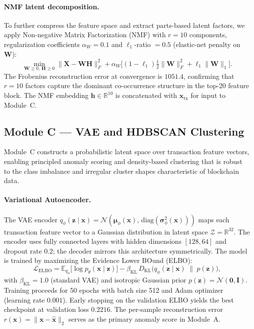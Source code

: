 \documentclass[journal]{IEEEtran}
\begin{document}
\paragraph{NMF latent decomposition.}
To further compress the feature space and extract parts-based latent factors,
we apply Non-negative Matrix Factorization (NMF) with
$r = 10$ components, regularization coefficients
$\alpha_W = 0.1$ and $\ell_1$-ratio $= 0.5$
(elastic-net penalty on $\mathbf{W}$):
\begin{equation}
  \min_{\mathbf{W} \geq 0,\, \mathbf{H} \geq 0}
    \bigl\|\mathbf{X} - \mathbf{W}\mathbf{H}\bigr\|_F^2
    + \alpha_W \bigl[(1 - \ell_1)\tfrac{1}{2}\|\mathbf{W}\|_F^2
                    + \ell_1 \|\mathbf{W}\|_1\bigr].
  \label{eq:nmf}
\end{equation}
The Frobenius reconstruction error at convergence is $\num{1051.4}$,
confirming that $r = 10$ factors capture the dominant co-occurrence structure
in the top-20 feature block.
The NMF embedding $\mathbf{h} \in \mathbb{R}^{10}$ is concatenated with
$\mathbf{x}_{\mathrm{tx}}$ for input to Module~C.

\subsection{Module C — VAE and HDBSCAN Clustering}
\label{sec:module_c}

Module~C constructs a probabilistic latent space over transaction feature
vectors, enabling principled anomaly scoring and density-based clustering
that is robust to the class imbalance and irregular cluster shapes
characteristic of blockchain data.

\paragraph{Variational Autoencoder.}
The VAE encoder
$q_\phi(\mathbf{z} \mid \mathbf{x}) = \mathcal{N}(\boldsymbol{\mu}_\phi(\mathbf{x}),\,
\mathrm{diag}(\boldsymbol{\sigma}^2_\phi(\mathbf{x})))$
maps each transaction feature vector to a Gaussian distribution in latent
space $\mathcal{Z} = \mathbb{R}^{32}$.
The encoder uses fully connected layers with hidden dimensions $[128, 64]$
and dropout rate $0.2$; the decoder mirrors this architecture symmetrically.
The model is trained by maximizing the Evidence Lower BOund (ELBO):
\begin{equation}
  \mathcal{L}_{\mathrm{ELBO}}
    = \mathbb{E}_{q_\phi}\bigl[\log p_\theta(\mathbf{x} \mid \mathbf{z})\bigr]
      - \beta_{\mathrm{KL}}\,
        D_{\mathrm{KL}}\!\bigl(q_\phi(\mathbf{z} \mid \mathbf{x})
                               \;\|\; p(\mathbf{z})\bigr),
  \label{eq:elbo}
\end{equation}
with $\beta_{\mathrm{KL}} = 1.0$ (standard VAE) and isotropic Gaussian prior
$p(\mathbf{z}) = \mathcal{N}(\mathbf{0}, \mathbf{I})$.
Training proceeds for 50 epochs with batch size 512 and Adam
optimizer~\cite{Kingma2014} (learning rate $0.001$).
Early stopping on the validation ELBO yields the best checkpoint at validation
loss $0.2216$.
The per-sample reconstruction error
$r(\mathbf{x}) = \|\mathbf{x} - \hat{\mathbf{x}}\|_2$
serves as the primary anomaly score in Module~A.
\end{document}
